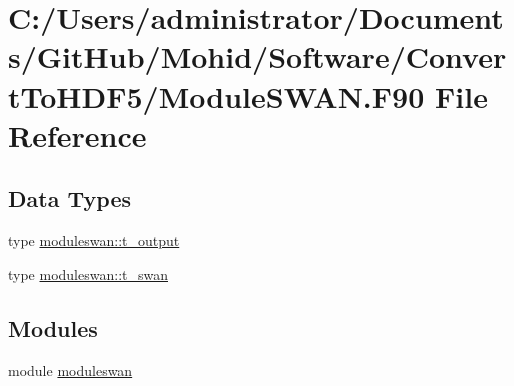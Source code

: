 \hypertarget{_module_s_w_a_n_8_f90}{}\section{C\+:/\+Users/administrator/\+Documents/\+Git\+Hub/\+Mohid/\+Software/\+Convert\+To\+H\+D\+F5/\+Module\+S\+W\+AN.F90 File Reference}
\label{_module_s_w_a_n_8_f90}
\subsection*{Data Types}
\begin{DoxyCompactItemize}
\item 
type \mbox{\hyperlink{structmoduleswan_1_1t__output}{moduleswan\+::t\+\_\+output}}
\item 
type \mbox{\hyperlink{structmoduleswan_1_1t__swan}{moduleswan\+::t\+\_\+swan}}
\end{DoxyCompactItemize}
\subsection*{Modules}
\begin{DoxyCompactItemize}
\item 
module \mbox{\hyperlink{namespacemoduleswan}{moduleswan}}
\end{DoxyCompactItemize}
